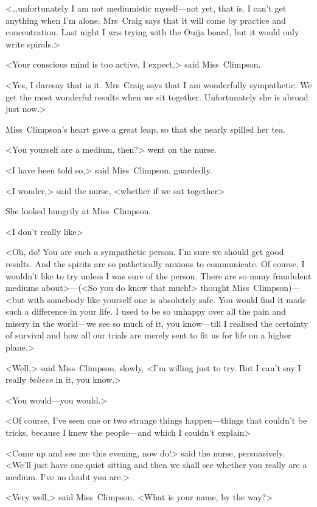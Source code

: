 <\dots unfortunately I am not mediumistic myself—not yet, that is. I can't get anything when I'm alone. Mrs~Craig says that it will come by practice and concentration. Last night I was trying with the Ouija board, but it would only write spirals.>

<Your conscious mind is too active, I expect,> said Miss~Climpson.

<Yes, I daresay that is it. Mrs~Craig says that I am wonderfully sympathetic. We get the most wonderful results when we sit together. Unfortunately she is abroad just now.>

Miss~Climpson's heart gave a great leap, so that she nearly spilled her tea.

<You yourself are a medium, then?> went on the nurse.

<I have been told so,> said Miss~Climpson, guardedly.

<I wonder,> said the nurse, <whether if we sat together\longdash>

She looked hungrily at Miss~Climpson.

<I don't really like\longdash>

<Oh, do! You are such a sympathetic person. I'm sure we should get good results. And the spirits are so pathetically anxious to communicate. Of course, I wouldn't like to try unless I was sure of the person. There are so many fraudulent mediums about>—(<So you do know that much!> thought Miss~Climpson)—<but with somebody like yourself one is absolutely safe. You would find it made such a difference in your life. I used to be so unhappy over all the pain and misery in the world—we see so much of it, you know—till I realised the certainty of survival and how all our trials are merely sent to fit us for life on a higher plane.>

<Well,> said Miss~Climpson, slowly, <I'm willing just to try. But I can't say I really \emph{believe} in it, you know.>

<You would—you would.>

<Of course, I've seen one or two strange things happen—things that couldn't be tricks, because I knew the people—and which I couldn't explain\longdash>

<Come up and see me this evening, now do!> said the nurse, persuasively. <We'll just have one quiet sitting and then we shall see whether you really are a medium. I've no doubt you are.>

<Very well,> said Miss~Climpson. <What is your name, by the way?>

